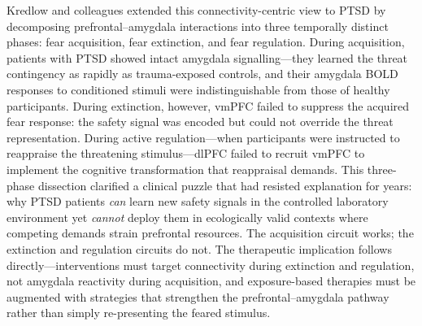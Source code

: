 Kredlow and colleagues extended this connectivity-centric view to PTSD by
decomposing prefrontal--amygdala interactions into three temporally distinct
phases: fear acquisition, fear extinction, and fear regulation.
During acquisition, patients with PTSD showed intact amygdala
signalling---they learned the threat contingency as rapidly as
trauma-exposed controls, and their amygdala BOLD responses to conditioned
stimuli were indistinguishable from those of healthy participants.  During
extinction, however, vmPFC failed to suppress the acquired fear response:
the safety signal was encoded but could not override the threat
representation.  During active regulation---when participants were
instructed to reappraise the threatening stimulus---dlPFC failed to recruit
vmPFC to implement the cognitive transformation that reappraisal demands.
This three-phase dissection clarified a clinical puzzle that had resisted
explanation for years: why PTSD patients \emph{can} learn new safety
signals in the controlled laboratory environment yet \emph{cannot} deploy
them in ecologically valid contexts where competing demands strain
prefrontal resources.  The acquisition circuit works; the extinction and
regulation circuits do not.  The therapeutic implication follows
directly---interventions must target connectivity during extinction and
regulation, not amygdala reactivity during acquisition, and
exposure-based therapies must be augmented with strategies that strengthen
the prefrontal--amygdala pathway rather than simply re-presenting the
feared stimulus.

